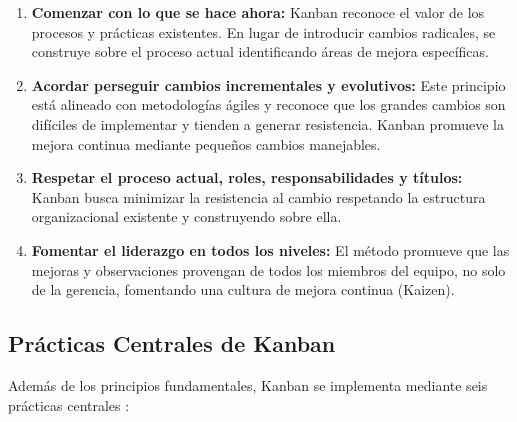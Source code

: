 \begin{enumerate}
    \item \textbf{Comenzar con lo que se hace ahora:} Kanban reconoce el valor de los procesos y prácticas existentes. En lugar de introducir cambios radicales, se construye sobre el proceso actual identificando áreas de mejora específicas.
    
    \item \textbf{Acordar perseguir cambios incrementales y evolutivos:} Este principio está alineado con metodologías ágiles y reconoce que los grandes cambios son difíciles de implementar y tienden a generar resistencia. Kanban promueve la mejora continua mediante pequeños cambios manejables.
    
    \item \textbf{Respetar el proceso actual, roles, responsabilidades y títulos:} Kanban busca minimizar la resistencia al cambio respetando la estructura organizacional existente y construyendo sobre ella.
    
    \item \textbf{Fomentar el liderazgo en todos los niveles:} El método promueve que las mejoras y observaciones provengan de todos los miembros del equipo, no solo de la gerencia, fomentando una cultura de mejora continua (Kaizen).
\end{enumerate}

\subsection{Prácticas Centrales de Kanban}

Además de los principios fundamentales, Kanban se implementa mediante seis prácticas centrales \cite{djaa2021}:

